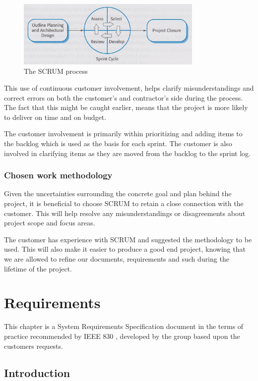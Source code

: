 \documentclass[11pt]{book}
\begin{document}
\begin{figure}[H]
      \centering
      \includegraphics[width=0.8\textwidth]{Figures/Prestudy/SCRUM.jpeg}
      \caption{The SCRUM process}
      \label{fig:pre_scrum}
\end{figure}

This use of continuous customer involvement, helps clarify misunderstandings and correct errors on both the customer's and contractor's side during the process. The fact that this might be caught earlier, means that the project is more likely to deliver on time and on budget.

The customer involvement is primarily within prioritizing and adding items to the backlog which is used as the basis for each sprint. The customer is also involved in clarifying items as they are moved from the backlog to the sprint log.


\subsection{Chosen work methodology}
Given the uncertainties surrounding the concrete goal and plan behind the project, it is beneficial to choose SCRUM to retain a close connection with the customer. This will help resolve any misunderstandings or disagreements about project scope and focus areas.

The customer has experience with SCRUM and suggested the methodology to be used. This will also make it easier to produce a good end project, knowing that we are allowed to refine our documents, requirements and such during the lifetime of the project.

\chapter{Requirements} \label{chap:req}

This chapter is a System Requirements Specification document in the terms of practice recommended by IEEE 830 \cite{ieee830}, developed by the group based upon the customers requests.

\section{Introduction}
\end{document}
